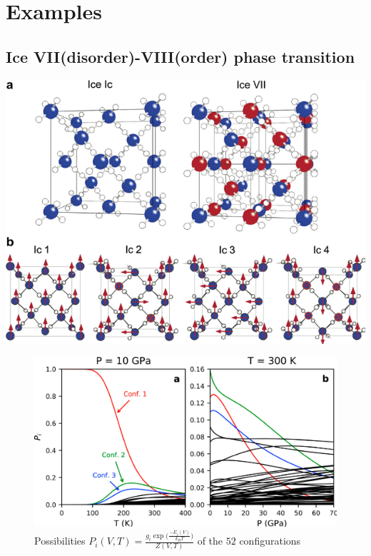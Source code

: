 \documentclass[13pt,aspectratio=169]{beamer}
\begin{document}
\section{Examples}

\subsection{Ice VII(disorder)-VIII(order) phase transition}
\begin{frame}{\subsecname}
	\centering
	\includegraphics[height=0.9\textheight]{images/ice7}%
\end{frame}

\begin{frame}{\subsecname}
	\begin{figure}
		\includegraphics[height=0.75\textheight]{images/ice_prob}%
		\caption{Possibilities $P_i(V, T) = \frac{g_i \exp\Big(\frac{-E_i(V)}{k_B T}\Big)}{Z(V, T)}$ of the $52$ configurations}
	\end{figure}
\end{frame}
\end{document}
